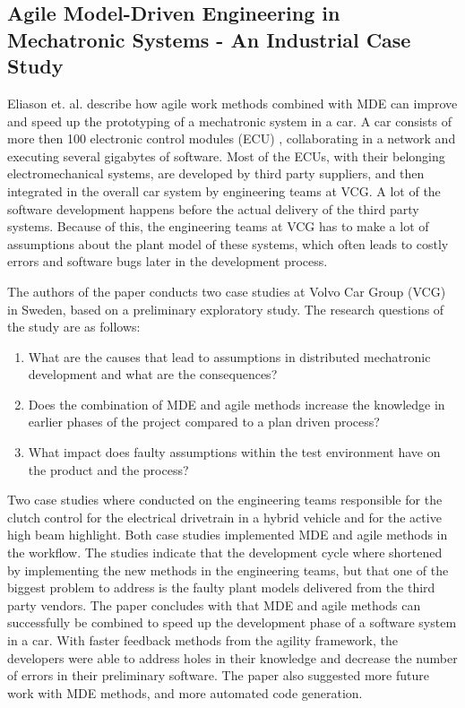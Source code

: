 \documentclass[10pt, a4paper, twocolumn]{article}
\begin{document}
\subsection{Agile Model-Driven Engineering in Mechatronic Systems - An Industrial Case Study}

Eliason et. al. \cite{Eliasson2014} describe how agile work methods combined with MDE can improve and speed up the prototyping of a mechatronic system in a car. A car consists of more then 100 electronic control modules (ECU) , collaborating in a network and executing several gigabytes of software. Most of the ECUs, with their belonging electromechanical systems, are developed by third party suppliers, and then integrated in the overall car system by engineering teams at VCG.  A lot of the software development happens before the actual delivery of the third party systems. Because of this, the engineering teams at VCG has to make a lot of assumptions about the plant model of these systems, which often leads to costly errors and software bugs later in the development process. 

The authors of the paper conducts two case studies at Volvo Car Group (VCG) in Sweden, based on a preliminary exploratory study. The research questions of the study are as follows: 

\begin{enumerate}
\item What are the causes that lead to assumptions in distributed mechatronic development and what are the consequences? 
\item Does the combination of MDE and agile methods increase the knowledge in earlier phases of the project compared to a plan driven process? 
\item What impact does faulty assumptions within the test environment have on the product and the process? 
\end{enumerate}

Two case studies where conducted on the engineering teams responsible for the clutch control for the electrical drivetrain in a hybrid vehicle and for the active high beam highlight. Both case studies implemented MDE and agile methods in the workflow. The studies indicate that the development cycle where shortened by implementing the new methods in the engineering teams, but that one of the biggest problem to address is the faulty plant models delivered from the third party vendors. The paper concludes with that MDE and agile methods can successfully be combined to speed up the development phase of a software system in a car. With faster feedback methods from the agility framework, the developers were able to address holes in their knowledge and decrease the number of errors in their preliminary software. The paper also suggested more future work with MDE methods, and more automated code generation.
\end{document}
